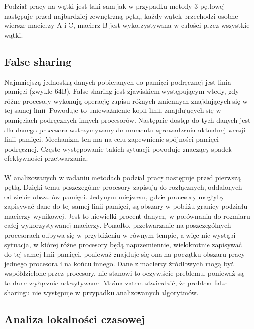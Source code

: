 \documentclass[12pt,a4paper]{article}
\begin{document}
Podział pracy na wątki jest taki sam jak w przypadku metody 3 pętlowej -  następuje przed najbardziej zewnętrzną pętlą, każdy wątek przechodzi osobne wiersze macierzy A i C, macierz B jest wykorzystywana w całości przez wszystkie wątki.


\subsection{False sharing}

Najmniejszą jednostką danych pobieranych do pamięci podręcznej jest linia pamięci (zwykle 64B). False sharing jest zjawiskiem występującym wtedy, gdy różne procesory wykonują operację zapisu różnych zmiennych znajdujących się w tej samej linii. Powoduje to unieważnienie kopii linii, znajdujących się w pamięciach podręcznych innych procesorów. Następnie dostęp do tych danych jest dla danego procesora wstrzymywany do momentu sprowadzenia aktualnej wersji linii pamięci. Mechanizm ten ma na celu zapewnienie spójności pamięci podręcznej. Częste występowanie takich sytuacji powoduje znaczący spadek efektywności przetwarzania.\\
\\
W analizowanych w zadaniu metodach podział pracy następuje przed pierwszą pętlą. Dzięki temu poszczególne procesory zapisują do rozłącznych, oddalonych od siebie obszarów pamięci. Jedynym miejscem, gdzie procesory mogłyby zapisywać dane do tej samej linii pamięci, są obszary w pobliżu granicy podziału macierzy wynikowej. Jest to niewielki procent danych, w porównaniu do rozmiaru całej wykorzystywanej macierzy. Ponadto, przetwarzanie na poszczególnych procesorach odbywa się w przybliżeniu w równym tempie, a więc nie wystąpi sytuacja, w której różne procesory będą naprzemiennie, wielokrotnie zapisywać do tej samej linii pamięci, ponieważ znajduje się ona na początku obszaru pracy jednego procesora i na końcu innego. Dane z macierzy źródłowych mogą być współdzielone przez procesory, nie stanowi to oczywiście problemu, ponieważ są to dane wyłącznie odczytywane. Można zatem stwierdzić, że problem false sharingu nie występuje w przypadku analizowanych algorytmów.

\subsection{Analiza lokalności czasowej}
\end{document}
